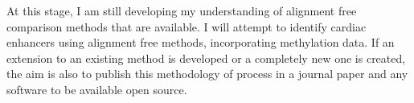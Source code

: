 At this stage, I am still developing my understanding of alignment free comparison methods that are available. I will attempt to identify cardiac enhancers using alignment free methods, incorporating methylation data.
If an extension to an existing method is developed or a completely new one is created, the aim is also to publish this methodology of process in a journal paper and any software to be available open source.